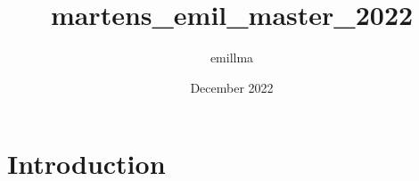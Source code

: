 \documentclass{article}
\title{martens_emil_master_2022}
\author{emillma }
\date{December 2022}
\begin{document}
\maketitle

\section{Introduction}
\end{document}
